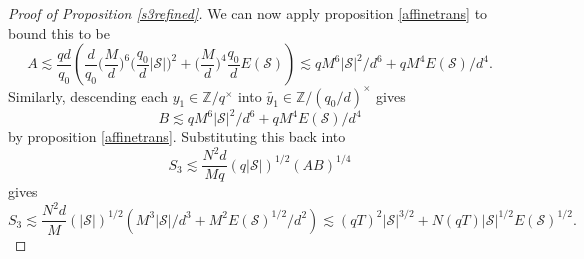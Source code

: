 \begin{proof}[Proof of Proposition \ref{s3refined}]
We can now apply proposition \ref{affinetrans} to bound this to be \[
    A\lesssim \frac{qd}{q_0} \left(\frac{d}{q_0}\Big(\frac{M}{d}\Big)^6\Big(\frac{q_0}{d}|\mathcal{S}|\Big)^2 +
    \Big(\frac{M}{d}\Big)^4\frac{q_0}{d}E(\mathcal{S})
    \right) \lesssim qM^6|\mathcal{S}|^2/d^6 + qM^4E(\mathcal{S})/d^4.
\]
Similarly, descending each $y_1\in\mathbb{Z}/q^{\times}$ into $\tilde{y_1} \in \mathbb{Z}/(q_0/d)^{\times}$ gives \[
    B\lesssim  qM^6|\mathcal{S}|^2/d^6 + qM^4E(\mathcal{S})/d^4
\]
by proposition \ref{affinetrans}.
Substituting this back into \[
S_3\lesssim \frac{N^2d}{Mq}(q|\mathcal{S}|)^{1/2}(AB)^{1/4}
\]
gives \[
S_3 \lesssim \frac{N^2d}{M}(|\mathcal{S}|)^{1/2}(M^3|\mathcal{S}|/d^3 + M^2E(\mathcal{S})^{1/2}/d^2)\lesssim (qT)^{2}|\mathcal{S}|^{3/2}+N(qT)|\mathcal{S}|^{1/2}E(\mathcal{S})^{1/2}.
\]
\end{proof}